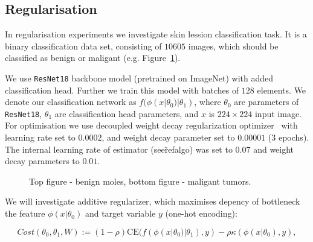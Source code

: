 \documentclass{article}
\newcommand{\CE}{\mathrm{CE}}
\begin{document}
{\subsection{Regularisation}
In regularisation experiments we investigate skin lession classification task. It is a binary classification data set, consisting of $10605$ images, which should be classified as benign or maligant (e.g. Figure~\ref{fig:Pneumonia_dataset_examples}).

We use \verb|ResNet18| backbone model (pretrained on ImageNet) with added classification head. Further we train this model with batches of $128$ elements.
We denote our classification network as $f(\phi(x|\theta_{0})|\theta_{1})$, where $\theta_{0}$ are parameters of \verb|ResNet18|, $\theta_{1}$ are classification head parameters, and $x$ is $224\times 224$ input image.
For optimisation we use decoupled weight decay regularization optimizer~\cite{Loshchilov2019DecoupledWD} with learning rate set to $0.0002$, and weight decay parameter set to $0.00001$ ($3$ epochs).
The internal learning rate of estimator (see\~ref{algo}) was set to $0.07$ and weight decay parameters to $0.01$.

\begin{figure}%
	\centering
	\qquad
	\caption{Top figure - benign moles, bottom figure - maligant tumors.}
	\label{fig:Pneumonia_dataset_examples}
\end{figure}


We will investigate additive regularizer, which maximises depency of bottleneck the feature $\phi(x|\theta_{0})$ and target variable $y$ (one-hot encoding): 


\begin{equation}
\label{eq:regularizer1}
Cost(\theta_{0},\theta_{1}, W) := (1-\rho)\CE(f(\phi(x|\theta_{0})|\theta_{1}),y) - \rho \kappa(\phi(x|\theta_{0}),y),
\end{equation}

}
\end{document}
